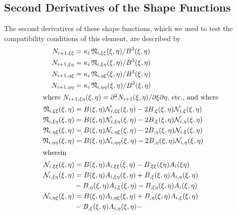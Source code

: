 \subsection{Second Derivatives of the Shape Functions}

The second derivatives of these shape functions, which we used to test the compatibility conditions of this element, are described by
\begin{subequations}
	\begin{align}
	N_{i+1,\xi\xi} & = \kappa_i \, \mathfrak{N}_{i,\xi\xi}(\xi,\eta) /
	B^3 (\xi,\eta) \\
	N_{i+1,\xi\eta} & = \kappa_i \, \mathfrak{N}_{i,\xi\eta}(\xi,\eta) /
	B^3(\xi,\eta) \\
	N_{i+1,\eta\xi} & = \kappa_i \, \mathfrak{N}_{i,\eta\xi}(\xi,\eta) /
	B^3(\xi,\eta) \\
	N_{i+1,\eta\eta} & = \kappa_i \, \mathfrak{N}_{i,\eta\eta}(\xi,\eta) /
	B^3(\xi,\eta) \\
	\intertext{where $N_{i+1,\xi\eta}  (\xi, \eta) = \partial^2 N_{i+1} (\xi, \eta) / \partial \xi \partial \eta$, etc., and  where}
	\mathfrak{N}_{i,\xi\xi} (\xi,\eta) & = B(\xi,\eta)
	\mathcal{N}_{i,\xi\xi} (\xi,\eta) - 2 B_{,\xi} (\xi,\eta) 
	\mathcal{N}_{i,\xi} (\xi,\eta) \\
	\mathfrak{N}_{i,\xi\eta}  (\xi,\eta)& = B(\xi,\eta) 
	\mathcal{N}_{i,\xi\eta} (\xi,\eta) - 2 B_{,\xi} (\xi,\eta) 
	\mathcal{N}_{i,\eta} (\xi,\eta) \\
	\mathfrak{N}_{i,\eta\xi}  (\xi,\eta)& = B(\xi,\eta)
	\mathcal{N}_{i,\eta\xi} (\xi,\eta) - 2 B_{,\eta} (\xi,\eta) 
	\mathcal{N}_{i,\xi} (\xi,\eta) \\
	\mathfrak{N}_{i,\eta\eta} (\xi,\eta) & = B(\xi,\eta) 
	\mathcal{N}_{i,\eta\eta} (\xi,\eta) - 2 B_{,\eta} (\xi,\eta) 
	\mathcal{N}_{i,\eta} (\xi,\eta) \\
	\intertext{wherein}
	\mathcal{N}_{i,\xi\xi} (\xi,\eta) & = B(\xi,\eta) A_{i,\xi\xi} (\xi,\eta) -
	B_{,\xi\xi} (\xi\eta) A_{i} (\xi\eta) \\
	\mathcal{N}_{i,\xi\eta} (\xi,\eta) & = B (\xi,\eta) A_{i,\xi\eta} (\xi,\eta) +
	B_{,\xi} (\xi,\eta) A_{i,\eta} (\xi,\eta) \notag \\
	\mbox{} & - B_{,\eta} (\xi,\eta) A_{i,\xi} (\xi,\eta) - 
	B_{,\xi\eta} (\xi,\eta) A_i (\xi,\eta) \\
	\mathcal{N}_{i,\eta\xi} (\xi,\eta) & = B (\xi,\eta) A_{i,\eta\xi} (\xi,\eta) +
	B_{,\eta} (\xi,\eta) A_{i,\xi} (\xi,\eta) \notag \\
	\mbox{} & - B_{,\xi} (\xi,\eta) A_{i,\eta} (\xi,\eta) - 

\end{align}
\end{subequations}
